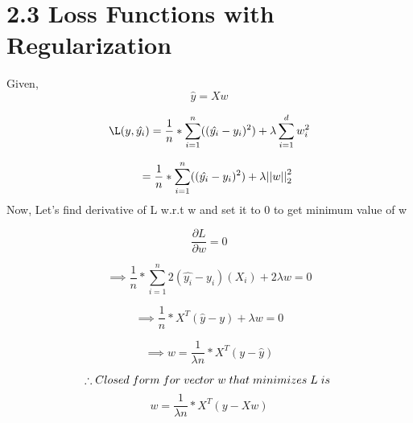 \section*{2.3 Loss Functions with Regularization}
Given,
\\
\[\hat{y} = Xw\]

\[\L(y,\hat{y_i}) = \frac{1}{n} * \sum_{i=1}^n ((\hat{y_i} - y_i)^{2}) +  \lambda \sum_{i=1}^d w_i^{2}\]

\[\hspace{0.5cm}  = \frac{1}{n} * \sum_{i=1}^n ((\hat{y_i} - y_i)^{2}) + \lambda {||w||}_{2}^{2} \]
Now, Let’s find derivative of L w.r.t w and set it to 0 to get minimum value of w 

\[\frac {\partial L}{\partial w} = 0\]

\[\implies \frac{1}{n} * \sum_{i=1}^n 2(\hat{y_i} - {y_i})({X_i}) + 2\lambda w = 0 \]

\[\implies \frac{1}{n} * X^{T} (\hat{y}-y) + \lambda w = 0\]

\[\implies w = \frac{1}{\lambda n} * X^{T}(y-\hat{y})\]

\[\therefore Closed \hspace{0.1cm} form\hspace{0.1cm} for\hspace{0.1cm} vector\hspace{0.1cm} w\hspace{0.1cm} that\hspace{0.1cm} minimizes\hspace{0.1cm} L\hspace{0.1cm} is\hspace{0.1cm} \]
\[w = \frac{1}{\lambda n} * X^{T}(y-Xw)\]
\\


